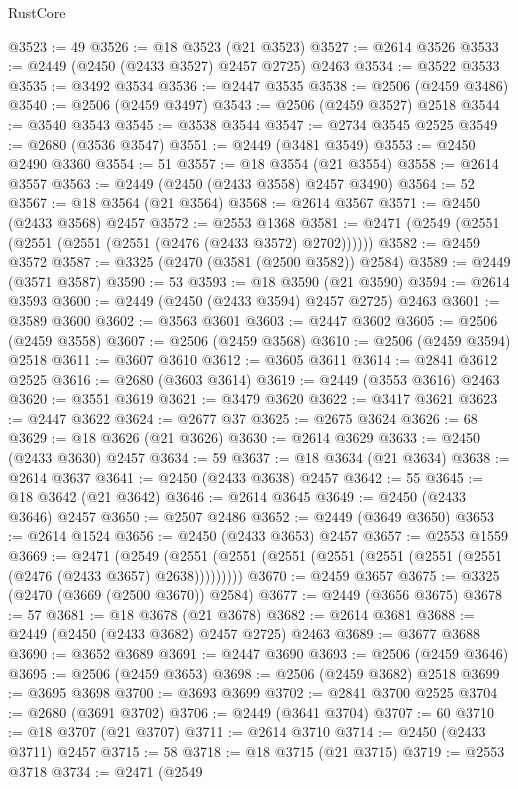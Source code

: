 \begin{lexlean}{RustCore}
\begin{coremodule}
@3523 := 49
@3526 := @18 @3523 (@21 @3523)
@3527 := @2614 @3526
@3533 := @2449 (@2450 (@2433 @3527) @2457 @2725) @2463
@3534 := @3522 @3533
@3535 := @3492 @3534
@3536 := @2447 @3535
@3538 := @2506 (@2459 @3486)
@3540 := @2506 (@2459 @3497)
@3543 := @2506 (@2459 @3527) @2518
@3544 := @3540 @3543
@3545 := @3538 @3544
@3547 := @2734 @3545 @2525
@3549 := @2680 (@3536 @3547)
@3551 := @2449 (@3481 @3549)
@3553 := @2450 @2490 @3360
@3554 := 51
@3557 := @18 @3554 (@21 @3554)
@3558 := @2614 @3557
@3563 := @2449 (@2450 (@2433 @3558) @2457 @3490)
@3564 := 52
@3567 := @18 @3564 (@21 @3564)
@3568 := @2614 @3567
@3571 := @2450 (@2433 @3568) @2457
@3572 := @2553 @1368
@3581 := @2471 (@2549 (@2551 (@2551 (@2551 (@2551 (@2476 (@2433 @3572) @2702))))))
@3582 := @2459 @3572
@3587 := @3325 (@2470 (@3581 (@2500 @3582)) @2584)
@3589 := @2449 (@3571 @3587)
@3590 := 53
@3593 := @18 @3590 (@21 @3590)
@3594 := @2614 @3593
@3600 := @2449 (@2450 (@2433 @3594) @2457 @2725) @2463
@3601 := @3589 @3600
@3602 := @3563 @3601
@3603 := @2447 @3602
@3605 := @2506 (@2459 @3558)
@3607 := @2506 (@2459 @3568)
@3610 := @2506 (@2459 @3594) @2518
@3611 := @3607 @3610
@3612 := @3605 @3611
@3614 := @2841 @3612 @2525
@3616 := @2680 (@3603 @3614)
@3619 := @2449 (@3553 @3616) @2463
@3620 := @3551 @3619
@3621 := @3479 @3620
@3622 := @3417 @3621
@3623 := @2447 @3622
@3624 := @2677 @37
@3625 := @2675 @3624
@3626 := 68
@3629 := @18 @3626 (@21 @3626)
@3630 := @2614 @3629
@3633 := @2450 (@2433 @3630) @2457
@3634 := 59
@3637 := @18 @3634 (@21 @3634)
@3638 := @2614 @3637
@3641 := @2450 (@2433 @3638) @2457
@3642 := 55
@3645 := @18 @3642 (@21 @3642)
@3646 := @2614 @3645
@3649 := @2450 (@2433 @3646) @2457
@3650 := @2507 @2486
@3652 := @2449 (@3649 @3650)
@3653 := @2614 @1524
@3656 := @2450 (@2433 @3653) @2457
@3657 := @2553 @1559
@3669 := @2471
    (@2549 (@2551 (@2551 (@2551 (@2551 (@2551 (@2551 (@2551 (@2476 (@2433 @3657) @2638)))))))))
@3670 := @2459 @3657
@3675 := @3325 (@2470 (@3669 (@2500 @3670)) @2584)
@3677 := @2449 (@3656 @3675)
@3678 := 57
@3681 := @18 @3678 (@21 @3678)
@3682 := @2614 @3681
@3688 := @2449 (@2450 (@2433 @3682) @2457 @2725) @2463
@3689 := @3677 @3688
@3690 := @3652 @3689
@3691 := @2447 @3690
@3693 := @2506 (@2459 @3646)
@3695 := @2506 (@2459 @3653)
@3698 := @2506 (@2459 @3682) @2518
@3699 := @3695 @3698
@3700 := @3693 @3699
@3702 := @2841 @3700 @2525
@3704 := @2680 (@3691 @3702)
@3706 := @2449 (@3641 @3704)
@3707 := 60
@3710 := @18 @3707 (@21 @3707)
@3711 := @2614 @3710
@3714 := @2450 (@2433 @3711) @2457
@3715 := 58
@3718 := @18 @3715 (@21 @3715)
@3719 := @2553 @3718
@3734 := @2471
    (@2549

\end{coremodule}
\end{lexlean}
